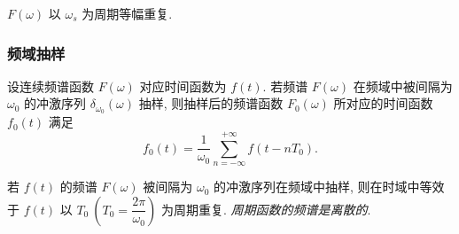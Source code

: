 $F(\omega)$ 以 $\omega_s$ 为周期等幅重复.

\subsubsection{频域抽样}
设连续频谱函数 $F(\omega)$ 对应时间函数为 $f(t)$. 若频谱 $F(\omega)$ 在频域中被间隔为 $\omega_0$ 的冲激序列 $\delta_{\omega_0}(\omega)$ 抽样, 则抽样后的频谱函数 $F_0(\omega)$ 所对应的时间函数 $f_0(t)$ 满足
\begin{equation}
    f_0(t)=\frac{1}{\omega_0}\sum_{n=-\infty}^{+\infty}f(t-nT_0).
\end{equation}

若 $f(t)$ 的频谱 $F(\omega)$ 被间隔为 $\omega_0$ 的冲激序列在频域中抽样, 则在时域中等效于 $f(t)$ 以 $T_0\ \left(T_0=\dfrac{2\pi}{\omega_0}\right)$ 为周期重复. \textit{周期函数的频谱是离散的}.
